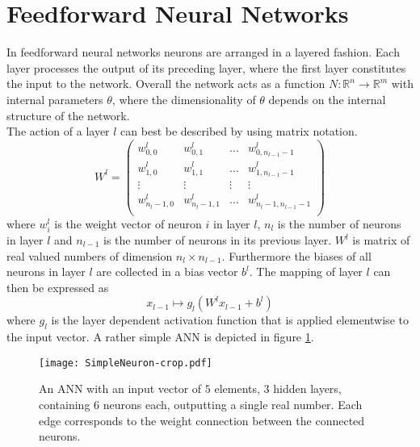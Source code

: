 \section{Feedforward Neural Networks}
\label{sec:ANN}
In feedforward neural networks neurons are arranged in a layered fashion. Each layer processes the output of its preceding layer, where the first layer constitutes the input to the network. Overall the network acts as a function $N: \mathbb{R}^n \rightarrow \mathbb{R}^m$ with internal parameters $\theta$, where the dimensionality of $\theta$ depends on the internal structure of the network.\\

The action of a layer $l$ can best be described by using matrix notation. 
\begin{equation}
W^l = 
\begin{pmatrix}
w_{0,0}^l & w_{0,1}^l & \dots & w_{0,n_{l-1}-1}^l \\
w_{1,0}^l & w_{1,1}^l & \dots & w_{1,n_{l-1}-1}^l \\
\vdots & \vdots & \vdots & \vdots \\
w_{n_l-1,0}^l & w_{n_l-1,1}^l & \dots & w_{n_l-1,n_{l-1}-1}^l \\
\end{pmatrix}
\end{equation}
where $w_i^l$ is the weight vector of neuron $i$ in layer $l$, $n_l$ is the number of neurons in layer $l$ and $n_{l-1}$ is the number of neurons in its previous layer. $W^l$ is matrix of real valued numbers of dimension $n_l \times n_{l-1}$. Furthermore the biases of all neurons in layer $l$ are collected in a bias vector $b^l$. The mapping of layer $l$ can then be expressed as 
\begin{equation}
x_{l-1} \mapsto g_l(W^l x_{l-1} + b^l)
\end{equation}
where $g_l$ is the layer dependent activation function that is applied elementwise to the input vector. A rather simple ANN is depicted in figure \ref{fig:ANN}. \\
\begin{figure}[H]
\centering
  \texttt{[image: SimpleNeuron-crop.pdf]}
  \caption{An ANN with an input vector of $5$ elements, $3$ hidden layers, containing $6$ neurons each, outputting a single real number. Each edge corresponds to the weight connection between the connected neurons. }
  \label{fig:ANN}
\end{figure}

